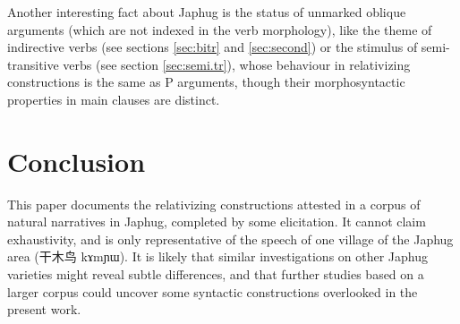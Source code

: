 \documentclass[oldfontcommands,oneside,a4paper,11pt]{article}
\newcommand{\ipa}[1]{{\phon #1}} %
\newcommand{\zh}[1]{{\cn #1}}
\begin{document}
Another interesting fact about Japhug is the status of unmarked oblique arguments (which are not indexed in the verb morphology), like the theme of indirective verbs (see sections \ref{sec:bitr} and \ref{sec:second}) or the stimulus of semi-transitive verbs (see section \ref{sec:semi.tr}),  whose behaviour in relativizing constructions is the same as P arguments, though their morphosyntactic properties in main clauses are distinct. 

\section{Conclusion}
This paper documents the relativizing constructions attested in a corpus of natural narratives in Japhug, completed by some elicitation. It cannot claim exhaustivity, and is only representative of the speech of one village of the Japhug area (\zh{干木鸟} \ipa{kɤmɲɯ}). It is likely that similar investigations on other Japhug varieties might reveal subtle differences, and that further studies based on a larger corpus could uncover some syntactic constructions overlooked in the present work.



\end{document}
